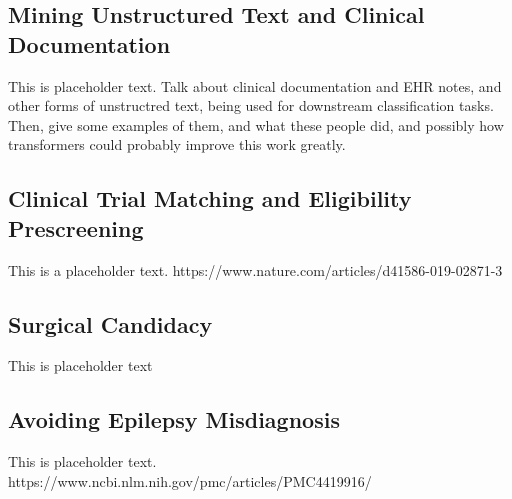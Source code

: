 \subsection{Mining Unstructured Text and Clinical Documentation}

This is placeholder text. Talk about clinical documentation and EHR notes, and other forms of unstructred text, being used for downstream classification tasks.
Then, give some examples of them, and what these people did, and possibly how transformers could probably improve this work greatly.

\subsection{Clinical Trial Matching and Eligibility Prescreening}

This is a placeholder text. https://www.nature.com/articles/d41586-019-02871-3

\subsection{Surgical Candidacy}

This is placeholder text

\subsection{Avoiding Epilepsy Misdiagnosis}

This is placeholder text. https://www.ncbi.nlm.nih.gov/pmc/articles/PMC4419916/
